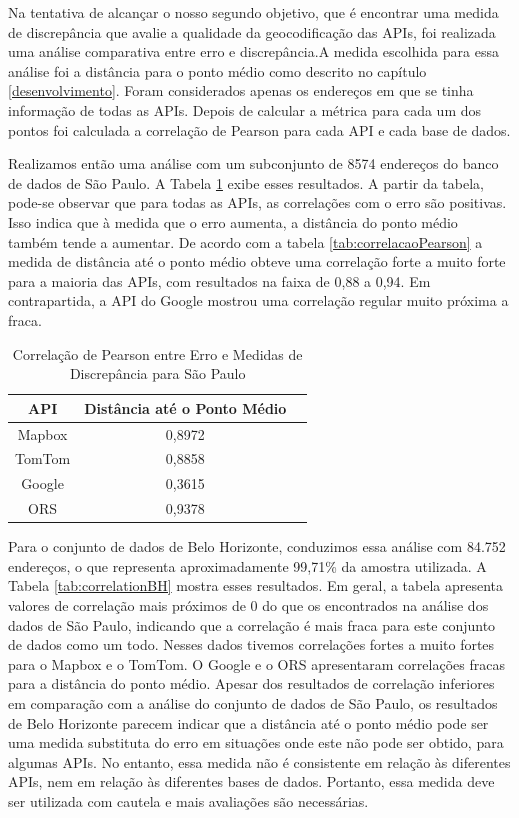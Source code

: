 Na tentativa de alcançar o nosso segundo objetivo, que é encontrar uma medida de discrepância que avalie a qualidade da geocodificação das APIs, foi realizada uma análise comparativa entre erro e discrepância.A medida escolhida para essa análise foi a distância para o ponto médio como descrito no capítulo \ref{desenvolvimento}. Foram considerados apenas os endereços em que se tinha informação de todas as APIs. Depois de calcular a métrica para cada um dos pontos foi calculada a correlação de Pearson para cada API e cada base de dados.  

Realizamos então uma análise com um subconjunto de 8574 endereços do banco de dados de São Paulo. A Tabela \ref{tab:correlationSP} exibe esses resultados. A partir da tabela, pode-se observar que para todas as APIs, as correlações com o erro são positivas. Isso indica que à medida que o erro aumenta, a distância do ponto médio também tende a aumentar. De acordo com a tabela \ref{tab:correlacaoPearson} a medida de distância até o ponto médio obteve uma correlação forte a muito forte para a maioria das APIs, com resultados na faixa de 0,88 a 0,94. Em contrapartida, a API do Google mostrou uma correlação regular muito próxima a fraca.

\begin{table}[h]
    \centering
    \caption{Correlação  de Pearson entre Erro e Medidas de Discrepância para São Paulo}
    \label{tab:correlationSP}
    \begin{adjustbox}{width=0.7\textwidth}
    \begin{tabular}{|c|c|c|}
    \hline
    API & Distância até o Ponto Médio \\
    \hline
    Mapbox & 0,8972 \\
    TomTom & 0,8858 \\
    Google & 0,3615 \\
    ORS & 0,9378 \\
    \hline
    \end{tabular}
    \end{adjustbox}
\end{table}

Para o conjunto de dados de Belo Horizonte, conduzimos essa análise com 84.752 endereços, o que representa aproximadamente 99,71\% da amostra utilizada. A Tabela \ref{tab:correlationBH} mostra esses resultados. Em geral, a tabela apresenta valores de correlação mais próximos de 0 do que os encontrados na análise dos dados de São Paulo, indicando que a correlação é mais fraca para este conjunto de dados como um todo. Nesses dados tivemos correlações fortes a muito fortes para o Mapbox e o TomTom. O Google e o ORS apresentaram correlações fracas para a distância do ponto médio. Apesar dos resultados de correlação inferiores em comparação com a análise do conjunto de dados de São Paulo, os resultados de Belo Horizonte parecem indicar que a distância até o ponto médio pode ser uma medida substituta do erro em situações onde este não pode ser obtido, para algumas APIs. No entanto, essa medida não é consistente em relação às diferentes APIs, nem em relação às diferentes bases de dados. Portanto, essa medida deve ser utilizada com cautela e mais avaliações são necessárias.

